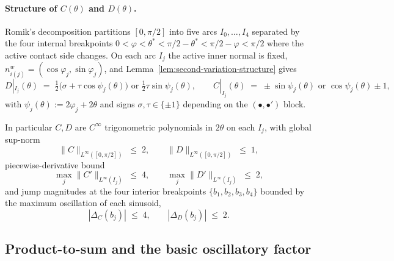 \paragraph{Structure of $C(\theta)$ and $D(\theta)$.}
Romik's decomposition partitions $[0,\pi/2]$ into five arcs
$I_{0},\ldots, I_{4}$ separated by the four internal breakpoints
$0 < \varphi < \theta^{\ast} < \pi/2 - \theta^{\ast} < \pi/2 - \varphi <
\pi/2$ where the active contact side changes.  On each arc
$I_{j}$ the active inner normal is fixed,
$n^{w}_{i(j)} = (\cos\varphi_{j},\sin\varphi_{j})$, and
Lemma~\ref{lem:second-variation-structure} gives
\begin{equation}\label{eq:CD-explicit}
   D|_{I_{j}}(\theta) \;=\; \tfrac{1}{2}\bigl(\sigma + \tau \cos\psi_{j}(\theta)\bigr)
                            \text{ or }
                            \tfrac{1}{2}\tau \sin\psi_{j}(\theta),
   \qquad
   C|_{I_{j}}(\theta) \;=\; \pm\sin\psi_{j}(\theta)
                            \text{ or }
                            \cos\psi_{j}(\theta) \pm 1,
\end{equation}
with $\psi_{j}(\theta) := 2\varphi_{j} + 2\theta$ and signs $\sigma,
\tau \in\{\pm 1\}$ depending on the $(\bullet,\bullet')$ block.

In particular $C, D$ are $C^{\infty}$ trigonometric polynomials in
$2\theta$ on each $I_{j}$, with global sup-norm
\begin{equation}\label{eq:CD-sup}
   \|C\|_{L^{\infty}([0,\pi/2])} \;\leq\; 2, \qquad
   \|D\|_{L^{\infty}([0,\pi/2])} \;\leq\; 1,
\end{equation}
piecewise-derivative bound
\begin{equation}\label{eq:CD-deriv}
   \max_{j}\|C'\|_{L^{\infty}(I_{j})} \;\leq\; 4, \qquad
   \max_{j}\|D'\|_{L^{\infty}(I_{j})} \;\leq\; 2,
\end{equation}
and jump magnitudes at the four interior breakpoints
$\{b_{1},b_{2},b_{3},b_{4}\}$ bounded by the maximum oscillation of
each sinusoid,
\begin{equation}\label{eq:jumps}
   |\Delta_{C}(b_{j})| \;\leq\; 4, \qquad
   |\Delta_{D}(b_{j})| \;\leq\; 2.
\end{equation}

\subsection{Product-to-sum and the basic oscillatory factor}

